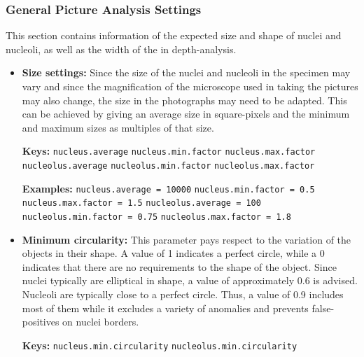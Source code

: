 \documentclass[a4paper, 12pt, twoside]{article}
\newcommand{\code}[1]{\colorbox{codegray}{\texttt{#1}}}
\begin{document}
\subsubsection{General Picture Analysis Settings}
This section contains information of the expected size and shape of nuclei and
nucleoli, as well as the width of the in depth-analysis.

\begin{itemize}
  \item \textbf{Size settings:} Since the size of the nuclei and nucleoli in the
  specimen may vary and since the magnification of the microscope used in taking the
  pictures may also change, the size in the photographs may need to be adapted.
  This can be achieved by giving an average size in square-pixels and the
  minimum and maximum sizes as multiples of that size.
  
  \textbf{Keys:}
  \newline \code{nucleus.average}
  \newline \code{nucleus.min.factor}
  \newline \code{nucleus.max.factor}
  \newline \code{nucleolus.average}
  \newline \code{nucleolus.min.factor}
  \newline \code{nucleolus.max.factor}
  
  \textbf{Examples:}
  \newline \code{nucleus.average = 10000}
  \newline \code{nucleus.min.factor = 0.5}
  \newline \code{nucleus.max.factor = 1.5}
  \newline \code{nucleolus.average = 100}
  \newline \code{nucleolus.min.factor = 0.75}
  \newline \code{nucleolus.max.factor = 1.8}
  
  \item \textbf{Minimum circularity:} This parameter pays respect to the
  variation of the objects in their shape. A value of 1 indicates a perfect
  circle, while a 0 indicates that there are no requirements to the shape of the
  object. Since nuclei typically are elliptical in shape, a value of
  approximately 0.6 is advised. Nucleoli are typically close to a perfect
  circle.
  Thus, a value of 0.9 includes most of them while it excludes a variety of
  anomalies and prevents false-positives on nuclei borders.
  
  \textbf{Keys:}
  \newline \code{nucleus.min.circularity}
  \newline \code{nucleolus.min.circularity}
  

\end{itemize}
\end{document}
